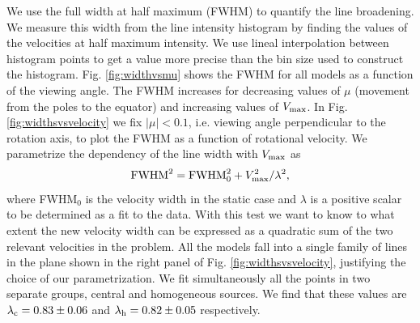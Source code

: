 We use the full width at half maximum (FWHM) to quantify the line
broadening.
We measure this width from the line intensity histogram by finding the
values of the velocities at half maximum intensity.
We use lineal interpolation between histogram points to get a value
more precise than the bin size used to construct the histogram.
Fig. \ref{fig:widthvsmu} shows the FWHM for all models as a function
of the viewing angle.
The FWHM increases for decreasing values of $\mu$ (movement from the
poles to the equator) and increasing values of $V_{\rm max}$.
In Fig.
\ref{fig:widthsvsvelocity} we fix $|\mu|<0.1$, i.e. viewing angle
perpendicular to the rotation axis, to plot the FWHM as a function of
rotational velocity.
We parametrize the dependency of the line width with $V_{\rm max}$ as
%
\begin{equation}
{\rm FWHM}^2 = {\rm FWHM}_{0}^2 + V_{\rm max}^2/\lambda^2,
\label{eq:fwhm}
\end{equation}
%
where FWHM$_{0}$ is the velocity width in the static case and $\lambda$
is a positive scalar to be determined as a fit to the data.
With this test we want to know to what extent the new velocity width can be
expressed as a quadratic sum of the two relevant velocities in the
problem.
All the models fall into a single family of lines in the plane shown
in the right panel of Fig. \ref{fig:widthsvsvelocity}, justifying
the choice of our parametrization.
We fit simultaneously all the points in two separate groups, central
and homogeneous sources.
We find that these values are $\lambda_{\rm c} = 0.83 \pm 0.06$ and
$\lambda_{\rm h}= 0.82\pm 0.05$ respectively.
